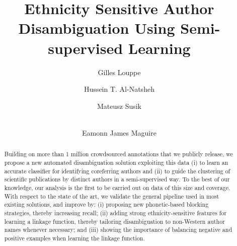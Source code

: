 \documentclass[runningheads,a4paper]{llncs}
\begin{document}
\title{Ethnicity Sensitive Author Disambiguation Using Semi-supervised Learning}

\author{Gilles Louppe\and Hussein T. Al-Natsheh\and Mateusz Susik\and\\ 
Eamonn James Maguire}



\maketitle
\begin{abstract}

Building on more than 1 million crowdsourced
annotations that we publicly release, we propose a new automated disambiguation
solution exploiting
this data (i) to learn an accurate classifier for identifying coreferring
authors and (ii) to guide the clustering of scientific publications by distinct
authors in a semi-supervised way. To the best of our knowledge, our analysis is
the first to be carried out on data of this size and coverage. With respect to
the state of the art, we validate the general pipeline used in most existing
solutions, and improve by: (i) proposing new phonetic-based blocking strategies,
thereby increasing recall; (ii) adding strong ethnicity-sensitive features for
learning a linkage function, thereby tailoring disambiguation to non-Western
author names whenever necessary; and (iii) showing the importance of balancing
negative and positive examples when learning the linkage function.

\end{abstract}
\end{document}
